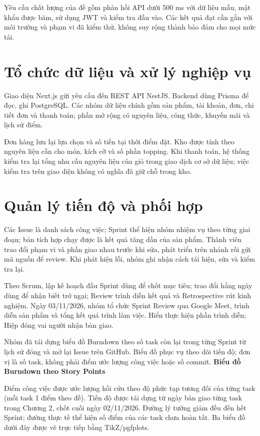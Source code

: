 \documentclass[12pt,a4paper]{report}
\begin{document}
Yêu cầu chất lượng của đề gồm phản hồi API dưới 500 ms với dữ liệu mẫu, mật khẩu được băm, sử dụng JWT và kiểm tra đầu vào. Các kết quả đạt cần gắn với môi trường và phạm vi đã kiểm thử, không suy rộng thành bảo đảm cho mọi mức tải.


\section{Tổ chức dữ liệu và xử lý nghiệp vụ}

Giao diện Next.js gửi yêu cầu đến REST API NestJS. Backend dùng Prisma để đọc, ghi PostgreSQL. Các nhóm dữ liệu chính gồm sản phẩm, tài khoản, đơn, chi tiết đơn và thanh toán; phần mở rộng có nguyên liệu, công thức, khuyến mãi và lịch sử điểm.


Đơn hàng lưu lại lựa chọn và số tiền tại thời điểm đặt. Kho được tính theo nguyên liệu cần cho món, kích cỡ và số phần topping. Khi thanh toán, hệ thống kiểm tra lại tổng nhu cầu nguyên liệu của giỏ trong giao dịch cơ sở dữ liệu; việc kiểm tra trên giao diện không có nghĩa đã giữ chỗ trong kho.


\section{Quản lý tiến độ và phối hợp}

Các Issue là danh sách công việc; Sprint thể hiện nhóm nhiệm vụ theo từng giai đoạn; bản tích hợp chạy được là kết quả tăng dần của sản phẩm. Thành viên trao đổi phạm vi và phần giao nhau trước khi sửa, phát triển trên nhánh rồi gửi mã nguồn để review. Khi phát hiện lỗi, nhóm ghi nhận cách tái hiện, sửa và kiểm tra lại.


Theo Scrum, lập kế hoạch đầu Sprint dùng để chốt mục tiêu; trao đổi hằng ngày dùng để nhận biết trở ngại; Review trình diễn kết quả và Retrospective rút kinh nghiệm. Ngày 03/11/2026, nhóm tổ chức Sprint Review qua Google Meet, trình diễn sản phẩm và tổng kết quá trình làm việc. Hiển thực hiện phần trình diễn; Hiệp đóng vai người nhận bàn giao.


Nhóm đã tái dựng biểu đồ Burndown theo số task còn lại trong từng Sprint từ lịch sử đóng và mở lại Issue trên GitHub. Biểu đồ phục vụ theo dõi tiến độ; đơn vị là số task, không phải điểm ước lượng công việc hoặc số commit.
\vspace{1em}
\textbf{Biểu đồ Burndown theo Story Points}

Điểm công việc được ước lượng hồi cứu theo độ phức tạp tương đối của từng task (mỗi task 1 điểm theo đề). Tiến độ được tái dựng từ ngày bàn giao từng task trong Chương 2, chốt cuối ngày 02/11/2026. Đường lý tưởng giảm đều đến hết Sprint; đường thực tế thể hiện số điểm của các task chưa hoàn tất. Ba biểu đồ dưới đây được vẽ trực tiếp bằng TikZ/pgfplots.
\end{document}
